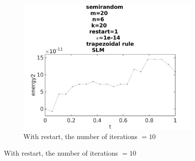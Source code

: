 \begin{figure}[H]
        ~
		\begin{subfigure}[b]{0.3\textwidth}
                \includegraphics[width=\textwidth]{../MATLAB/fig/energytestrestart1.jpg}
                \caption{ With restart, the number of iterations $= 10$ }
                \label{fig:energytestrestart1}
        \end{subfigure}
        

\end{figure}
